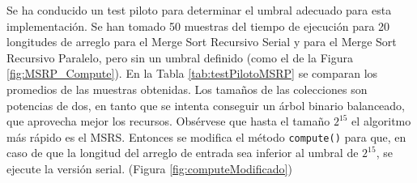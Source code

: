 \documentclass[titlepage]{article}
\begin{document}
Se ha conducido un test piloto para determinar el umbral adecuado para esta implementación. Se han tomado 50 muestras del tiempo de ejecución para 20 longitudes de arreglo para el Merge Sort Recursivo Serial y para el Merge Sort Recursivo Paralelo, pero sin un umbral definido (como el de la Figura \ref{fig:MSRP_Compute}). En la Tabla \ref{tab:testPilotoMSRP} se comparan los promedios de las muestras obtenidas. Los tamaños de las colecciones son potencias de dos, en tanto que se intenta conseguir un árbol binario balanceado, que aprovecha mejor los recursos. Obsérvese que hasta el tamaño $2^{15}$ el algoritmo más rápido es el MSRS. Entonces se modifica el método \lstinline{compute()} para que, en caso de que la longitud del arreglo de entrada sea inferior al umbral de $2^{15}$, se ejecute la versión serial. (Figura \ref{fig:computeModificado})
\end{document}
